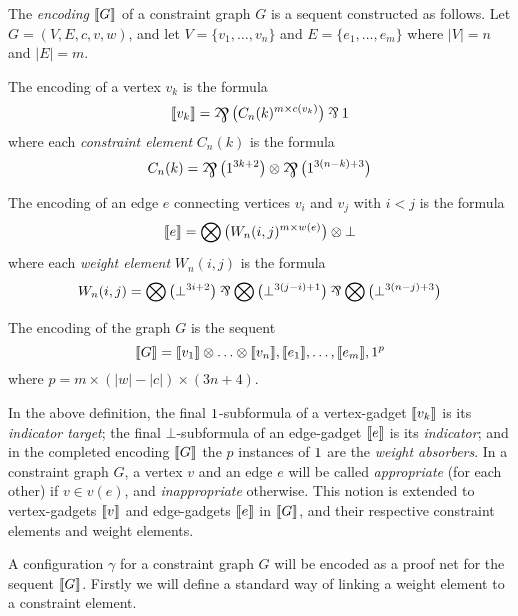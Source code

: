 \documentclass[conference]{IEEEtran}
\begin{document}
\begin{definition}
\label{def:graph encoding}
The \emph{encoding} $\llbracket G\rrbracket$ of a constraint graph $G$ is a sequent constructed as follows.
%
Let $G=(V,E,c,v,w)$, and let $V=\{v_1,\dotsc,v_n\}$ and $E=\{e_1,\dotsc,e_m\}$ where $|V|=n$ and $|E|=m$.

\noindent
The encoding of a vertex $v_k$ is the formula
\[
	\itn{v_k} = \bigparr\big(C_n(k)^{m\times c(v_k)} \big)\parr\1
\]
where each \emph{constraint element} $C_n(k)$ is the formula
\[
	C_n(k) = \bigparr\big(1^{3k+2}\big) \tn \bigparr\big(1^{3(n-k)+3}\big)
\]

\noindent
The encoding of an edge $e$ connecting vertices $v_i$ and $v_j$ with $i<j$ is the formula
\[
	\llbracket e\rrbracket = \bigotimes\big(W_n(i,j)^{m\times w(e)}\big)\otimes\bot
\]
where each \emph{weight element} $W_n(i,j)$ is the formula
\[
	W_n(i,j) = \bigtn\big(\bot^{3i+2}\big)\parr\bigtn\big(\bot^{3(j-i)+1}\big)\parr\bigtn\big(\bot^{3(n-j)+3}\big)
\]

\noindent
The encoding of the graph $G$ is the sequent
\[
	\llbracket G\rrbracket = \llbracket v_1\rrbracket\otimes\dotso\otimes\llbracket v_n\rrbracket, \llbracket e_1\rrbracket,\dotsc,\llbracket e_m\rrbracket, 1^p
\]
where $p=m\times(|w|-|c|)\times(3n+4)$.

\end{definition}



In the above definition, the final $1$-subformula of a vertex-gadget $\llbracket v_k\rrbracket$ is its \emph{indicator target}; the final $\bot$-subformula of an edge-gadget $\llbracket e\rrbracket$ is its \emph{indicator}; and in the completed encoding $\llbracket G\rrbracket$ the $p$ instances of $1$ are the \emph{weight absorbers}.
%
In a constraint graph $G$, a vertex $v$ and an edge $e$ will be called \emph{appropriate} (for each other) if $v\in v(e)$, and \emph{inappropriate} otherwise.
%
This notion is extended to vertex-gadgets $\llbracket v\rrbracket$ and edge-gadgets $\llbracket e\rrbracket$ in $\llbracket G\rrbracket$, and their respective constraint elements and weight elements.



A configuration $\gamma$ for a constraint graph $G$ will be encoded as a proof net for the sequent $\llbracket G\rrbracket$.
%
Firstly we will define a standard way of linking a weight element to a constraint element.
\end{document}
